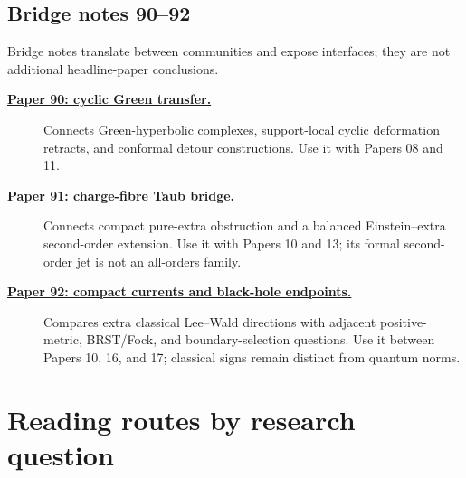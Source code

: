 \documentclass[11pt]{article}
\begin{document}
\subsection{Bridge notes 90--92}

Bridge notes translate between communities and expose interfaces; they are
not additional headline-paper conclusions.
\begin{description}
\item[\href{90-cyclic-green-transfer-bridge.pdf}{\textbf{Paper 90: cyclic
Green transfer.}}]
Connects Green-hyperbolic complexes, support-local cyclic deformation
retracts, and conformal detour constructions.  Use it with Papers 08 and 11.

\item[\href{91-charge-fibre-taub-bridge.pdf}{\textbf{Paper 91: charge-fibre
Taub bridge.}}]
Connects compact pure-extra obstruction and a balanced Einstein--extra
second-order extension.  Use it with Papers 10 and 13; its formal second-order
jet is not an all-orders family.

\item[\href{92-extra-axial-lee-wald-bridge.pdf}{\textbf{Paper 92: compact
currents and black-hole endpoints.}}]
Compares extra classical Lee--Wald directions with adjacent positive-metric,
BRST/Fock, and boundary-selection questions.  Use it between Papers 10,
16, and 17; classical signs remain distinct from quantum norms.
\end{description}

\section{Reading routes by research question}
\end{document}
